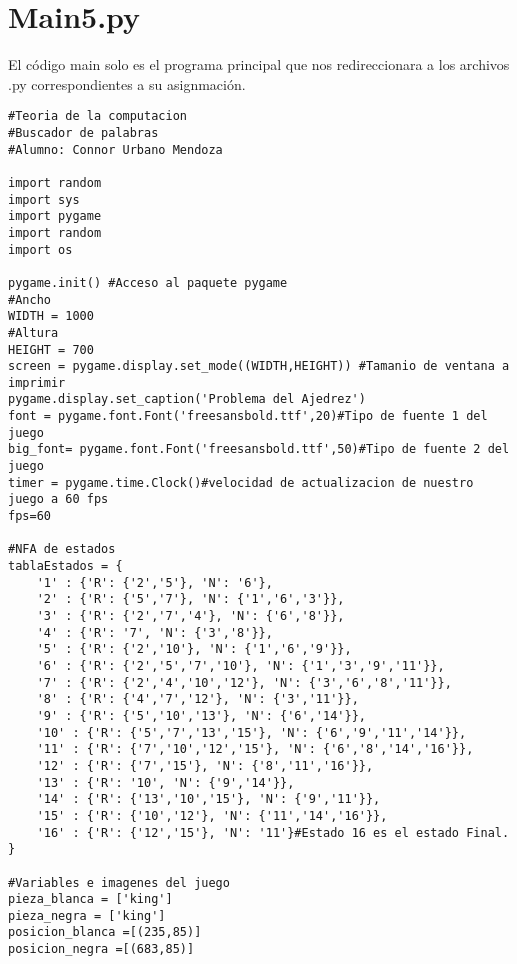 \section{Main5.py}
El código main solo es el programa principal que nos redireccionara a los archivos .py correspondientes a su asignmación. \newline
\\
\begin{lstlisting}
#Teoria de la computacion
#Buscador de palabras
#Alumno: Connor Urbano Mendoza

import random
import sys
import pygame
import random
import os

pygame.init() #Acceso al paquete pygame
#Ancho
WIDTH = 1000
#Altura
HEIGHT = 700
screen = pygame.display.set_mode((WIDTH,HEIGHT)) #Tamanio de ventana a imprimir
pygame.display.set_caption('Problema del Ajedrez')
font = pygame.font.Font('freesansbold.ttf',20)#Tipo de fuente 1 del juego
big_font= pygame.font.Font('freesansbold.ttf',50)#Tipo de fuente 2 del juego
timer = pygame.time.Clock()#velocidad de actualizacion de nuestro juego a 60 fps
fps=60

#NFA de estados
tablaEstados = {
    '1' : {'R': {'2','5'}, 'N': '6'},
    '2' : {'R': {'5','7'}, 'N': {'1','6','3'}},
    '3' : {'R': {'2','7','4'}, 'N': {'6','8'}},
    '4' : {'R': '7', 'N': {'3','8'}},
    '5' : {'R': {'2','10'}, 'N': {'1','6','9'}},
    '6' : {'R': {'2','5','7','10'}, 'N': {'1','3','9','11'}},
    '7' : {'R': {'2','4','10','12'}, 'N': {'3','6','8','11'}},
    '8' : {'R': {'4','7','12'}, 'N': {'3','11'}},
    '9' : {'R': {'5','10','13'}, 'N': {'6','14'}},
    '10' : {'R': {'5','7','13','15'}, 'N': {'6','9','11','14'}},
    '11' : {'R': {'7','10','12','15'}, 'N': {'6','8','14','16'}},
    '12' : {'R': {'7','15'}, 'N': {'8','11','16'}},
    '13' : {'R': '10', 'N': {'9','14'}},
    '14' : {'R': {'13','10','15'}, 'N': {'9','11'}},
    '15' : {'R': {'10','12'}, 'N': {'11','14','16'}},
    '16' : {'R': {'12','15'}, 'N': '11'}#Estado 16 es el estado Final.
}

#Variables e imagenes del juego
pieza_blanca = ['king']
pieza_negra = ['king']
posicion_blanca =[(235,85)]
posicion_negra =[(683,85)]


\end{lstlisting}
